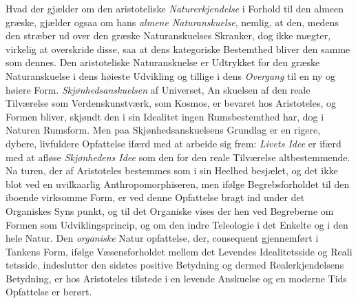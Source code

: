 \documentclass[12pt,a4paper]{book}
\begin{document}
Hvad der gjælder om den aristoteliske \emph{Naturerkjendelse}
i Forhold til den almeen græske, gjælder ogsaa om hans
\emph{almene Naturanskuelse}, nemlig, at den, medens den
stræber ud over den græske Naturanskuelses Skranker, dog ikke
mægter, virkelig at overskride disse, saa at dens kategoriske
Bestemthed bliver den samme som dennes. Den aristoteliske
Naturanskuelse er Udtrykket for den græske Naturanskuelse i
dens høieste Udvikling og tillige i dens \emph{Overgang} til en ny
og høiere Form. \emph{Skjønhedsanskuelsen} af Universet, An\-%
skuelsen af den reale Tilværelse som Verdenskunstværk, som
Kosmos, er bevaret hos Aristoteles, og Formen bliver, skjøndt
den i sin Idealitet ingen Rumsbestemthed har, dog i Naturen
Rumsform. Men paa Skjønhedsanskuelsens Grundlag er en
rigere, dybere, livfuldere Opfattelse ifærd med at arbeide sig
frem: \emph{Livets Idee} er ifærd med at afløse \emph{Skjønhedens
Idee} som den for den reale Tilværelse altbestemmende. Na\-%
turen, der af Aristoteles bestemmes som i sin Heelhed besjælet,
og det ikke blot ved en uvilkaarlig Anthropomorphiseren, men
ifølge Begrebsforholdet til den iboende virksomme Form, er
ved denne Opfattelse bragt ind under det Organiskes Syns\-%
punkt, og til det Organiske vises der hen ved Begreberne om
Formen som Udviklingsprincip, og om den indre Teleologie i
det Enkelte og i den hele Natur. Den \emph{organiske} Natur\-%
opfattelse, der, consequent gjennemført i Tankens Form, ifølge
Væsensforholdet mellem det Levendes Idealitetsside og Reali\-%
tetsside, indeslutter den sidstes positive Betydning og dermed
Realerkjendelsens Betydning, er hos Aristoteles tilstede i en
levende Anskuelse og en moderne Tids Opfattelse er berørt.
\end{document}
